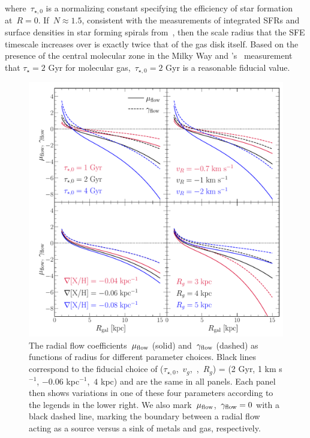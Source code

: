 where~$\tau_{\star,0}$ is a normalizing constant specifying the efficiency of
star formation at~$R = 0$.
If~$N \approx 1.5$, consistent with the measurements of integrated SFRs and
surface densities in star forming spirals from~\citet{Kennicutt1998}, then
the scale radius that the SFE timescale increases over is exactly twice that
of the gas disk itself.
Based on the presence of the central molecular zone in the Milky Way
\citep[e.g.,][]{Morris1996, Dahmen1998, PiercePrice2000, Hatchfield2020} and
\citeauthor{Leroy2008}'s~\citeyearpar{Leroy2008} measurement that
$\tau_\star = 2$ Gyr for molecular gas,~$\tau_{\star,0} = 2$ Gyr is a
reasonable fiducial value.

\begin{figure}
\centering
\includegraphics[scale = 0.5]{chapter7/muflow_gammaflow_vs_radius.pdf}
\caption{
The radial flow coefficients~$\mu_{\text{flow}}$ (solid) and~$\gamma_{\text{flow}}$ (dashed) as
functions of radius for different parameter choices.
Black lines correspond to the fiducial choice of
($\tau_{\star,0}$,~$v_g$,~,~$R_g$) = (2 Gyr, 1 km s$^{-1}$,
$-0.06$ kpc$^{-1}$,~$4$ kpc) and are the same in all panels.
Each panel then shows variations in one of these four parameters according to
the legends in the lower right.
We also mark~$\mu_{\text{flow}}$,~$\gamma_{\text{flow}} = 0$ with a black dashed line, marking
the boundary between a radial flow acting as a source versus a sink of metals
and gas, respectively.
}
\label{outflows:fig:flow-coefficients-vs-radius}
\end{figure}

